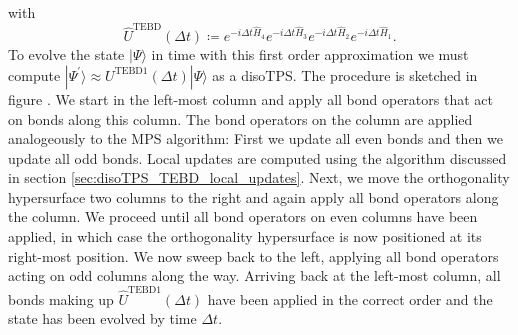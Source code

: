 with
\begin{equation}
	\label{eq:disoTPS_TEBD_first_order_TEBD_operator}
	\hat{U}^\text{TEBD}(\Delta t) \coloneqq e^{-i\Delta t\hat{H}_4} e^{-i\Delta t\hat{H}_3} e^{-i\Delta t\hat{H}_2} e^{-i\Delta t\hat{H}_1}.
\end{equation}
To evolve the state $|\Psi\rangle$ in time with this first order approximation we must compute $|\Psi^\prime\rangle \approx U^\text{TEBD1}(\Delta t)|\Psi\rangle$ as a disoTPS. The procedure is sketched in figure . We start in the left-most column and apply all bond operators that act on bonds along this column. The bond operators on the column are applied analogeously to the MPS algorithm: First we update all even bonds and then we update all odd bonds. Local updates are computed using the algorithm discussed in section \ref{sec:disoTPS_TEBD_local_updates}. Next, we move the orthogonality hypersurface two columns to the right and again apply all bond operators along the column. We proceed until all bond operators on even columns have been applied, in which case the orthogonality hypersurface is now positioned at its right-most position. We now sweep back to the left, applying all bond operators acting on odd columns along the way. Arriving back at the left-most column, all bonds making up $\hat{U}^\text{TEBD1}(\Delta t)$ have been applied in the correct order and the state has been evolved by time $\Delta t$. \par
